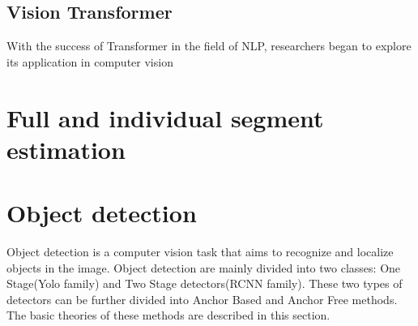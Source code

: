 \subsection{Vision Transformer}
  With the success of Transformer in the field of NLP, researchers began to explore its application in computer vision
\section{Full and individual segment estimation}
\section{Object detection}
  Object detection is a computer vision task that aims to recognize and localize objects in the image. Object detection are mainly divided into two classes: 
  One Stage(Yolo family) and Two Stage detectors(RCNN family). These two types of detectors can be further divided into Anchor Based and Anchor Free methods. 
  The basic theories of these methods are described in this section.
